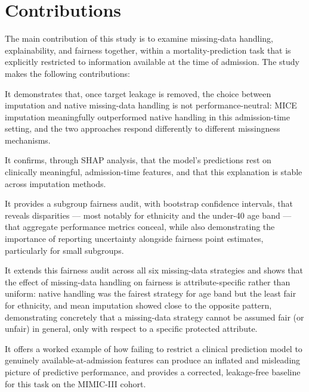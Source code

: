 \documentclass[12pt,a4paper]{report}
\begin{document}
\section{Contributions}
The main contribution of this study is to examine missing-data handling, explainability, and fairness together, within a mortality-prediction task that is explicitly restricted to information available at the time of admission. The study makes the following contributions:

It demonstrates that, once target leakage is removed, the choice between imputation and native missing-data handling is not performance-neutral: MICE imputation meaningfully outperformed native handling in this admission-time setting, and the two approaches respond differently to different missingness mechanisms.

It confirms, through SHAP analysis, that the model's predictions rest on clinically meaningful, admission-time features, and that this explanation is stable across imputation methods.

It provides a subgroup fairness audit, with bootstrap confidence intervals, that reveals disparities --- most notably for ethnicity and the under-40 age band --- that aggregate performance metrics conceal, while also demonstrating the importance of reporting uncertainty alongside fairness point estimates, particularly for small subgroups.

It extends this fairness audit across all six missing-data strategies and shows that the effect of missing-data handling on fairness is attribute-specific rather than uniform: native handling was the fairest strategy for age band but the least fair for ethnicity, and mean imputation showed close to the opposite pattern, demonstrating concretely that a missing-data strategy cannot be assumed fair (or unfair) in general, only with respect to a specific protected attribute.

It offers a worked example of how failing to restrict a clinical prediction model to genuinely available-at-admission features can produce an inflated and misleading picture of predictive performance, and provides a corrected, leakage-free baseline for this task on the MIMIC-III cohort.
\end{document}
